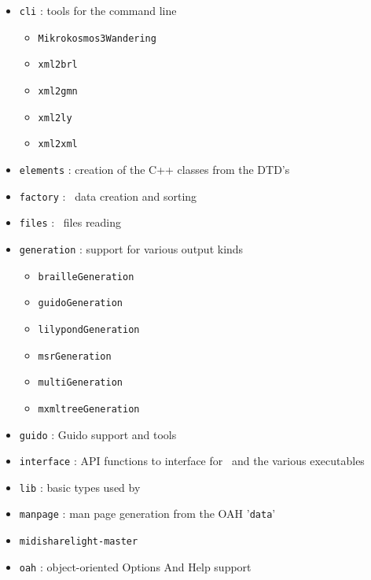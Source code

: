 \begin{itemize}

\item {\tt cli} : tools for the command line

  \begin{itemize}
  \item {\tt Mikrokosmos3Wandering}
  \item {\tt xml2brl}
  \item {\tt xml2gmn}
  \item {\tt xml2ly}
  \item {\tt xml2xml}
  \end{itemize}

\item {\tt elements} : creation of the C++ classes from the DTD's

\item {\tt factory} : \mxmlt\ data creation and sorting

\item {\tt files} : \mxml\ files reading

\item {\tt generation} : support for various output kinds

  \begin{itemize}
  \item {\tt brailleGeneration}
  \item {\tt guidoGeneration}
  \item {\tt lilypondGeneration}
  \item {\tt msrGeneration}
  \item {\tt multiGeneration}
  \item {\tt mxmltreeGeneration}
  \end{itemize}

\item {\tt guido} : Guido support and tools

\item {\tt interface} : API functions to interface for \lib\ and the various executables

\item {\tt lib} : basic types used by \lib\

\item {\tt manpage} : man page generation from the OAH '{\tt data}'
%
\item {\tt midisharelight-master}

\item {\tt oah} : object-oriented Options And Help support


\end{itemize}
